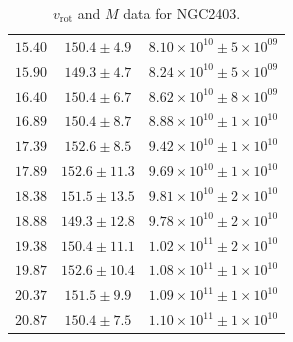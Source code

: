\documentclass{article}
\newcommand\vrot{\ensuremath{v_{\textrm{rot}}}}
\begin{document}
\begin{table}[h!]
\begin{tabular}{|c|c|c|}
        $15.40$ & $150.4 \pm 4.9$ & $8.10\times 10^{10} \pm 5\times 10^{09}$ \\
        $15.90$ & $149.3 \pm 4.7$ & $8.24\times 10^{10} \pm 5\times 10^{09}$ \\
        $16.40$ & $150.4 \pm 6.7$ & $8.62\times 10^{10} \pm 8\times 10^{09}$ \\
        $16.89$ & $150.4 \pm 8.7$ & $8.88\times 10^{10} \pm 1\times 10^{10}$ \\
        $17.39$ & $152.6 \pm 8.5$ & $9.42\times 10^{10} \pm 1\times 10^{10}$ \\
        $17.89$ & $152.6 \pm 11.3$ & $9.69\times 10^{10} \pm 1\times 10^{10}$ \\
        $18.38$ & $151.5 \pm 13.5$ & $9.81\times 10^{10} \pm 2\times 10^{10}$ \\
        $18.88$ & $149.3 \pm 12.8$ & $9.78\times 10^{10} \pm 2\times 10^{10}$ \\
        $19.38$ & $150.4 \pm 11.1$ & $1.02\times 10^{11} \pm 2\times 10^{10}$ \\
        $19.87$ & $152.6 \pm 10.4$ & $1.08\times 10^{11} \pm 1\times 10^{10}$ \\
        $20.37$ & $151.5 \pm 9.9$ & $1.09\times 10^{11} \pm 1\times 10^{10}$ \\
        $20.87$ & $150.4 \pm 7.5$ & $1.10\times 10^{11} \pm 1\times 10^{10}$ \\
        \hline
    \end{tabular}
    \caption{$\vrot$ and $M$ data for NGC2403.}
    \label{tab:proc2403}
\end{table}

\doublespacing
\end{document}
